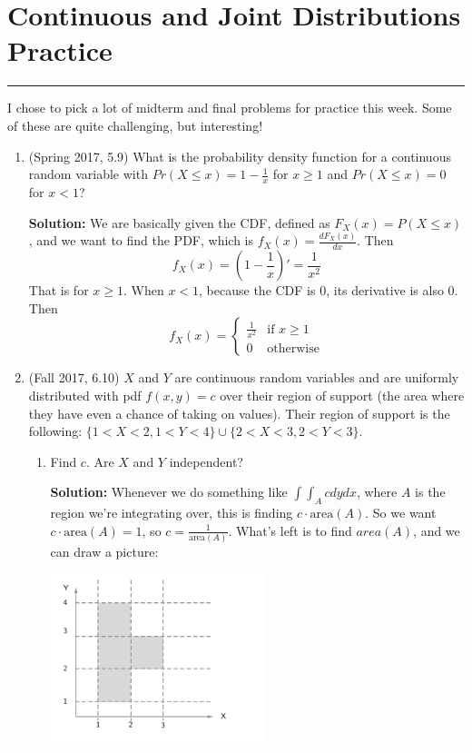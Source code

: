 \documentclass{article}
\newenvironment{solution}{

            \color{blue} \smallskip \textbf{Solution:}}{}
\begin{document}
    
    \part*{Continuous and Joint Distributions Practice}
    \vspace{-7pt}
    \hrule
    \vspace{7pt}
    I chose to pick a lot of midterm and final problems for practice this week. Some of these are quite challenging, but interesting!
    \begin{enumerate}
        \item (Spring 2017, 5.9) What is the probability density function for a continuous random variable with $Pr(X \leq x) = 1 - \frac{1}{x}$ for $x \geq 1$ and $Pr(X \leq x) = 0$ for $x < 1$?
        \begin{solution}
            We are basically given the CDF, defined as $F_X(x) = P(X \leq x)$, and we want to find the PDF, which is $f_X(x) = \frac{d F_X(x)}{dx}$. Then \[
                f_X(x) = \left(1 - \frac{1}{x}\right)' = \frac{1}{x^2}
            \]
            That is for $x \geq 1$. When $x < 1$, because the CDF is 0, its derivative is also 0. Then \[
                f_X(x) = \begin{cases}
                    \frac{1}{x^2} & \text{if } x \geq 1 \\
                    0 & \text{otherwise}
                \end{cases}
            \]
        \end{solution}
        \item (Fall 2017, 6.10) $X$ and $Y$ are continuous random variables and are uniformly distributed with pdf $f(x, y) = c$ over their
        region of support (the area where they have even a chance of taking on values). Their region of support is the following: $\{1 < X < 2, 1 < Y < 4\} \cup \{2 < X < 3, 2 < Y < 3\}$.
        \begin{enumerate}
            \item Find $c$. Are $X$ and $Y$ independent?
            \begin{solution}
                Whenever we do something like $\int \int_A c dy dx$, where $A$ is the region we're integrating over, this is finding $c \cdot \text{area}(A)$. So we want $c \cdot \text{area}(A) = 1$, so
                $c = \frac{1}{\text{area}(A)}$. What's left is to find $area(A)$, and we can draw a picture:

                \includegraphics[height=5cm]{prob2-fig}


\end{solution}
\end{enumerate}
\end{enumerate}
\end{document}
